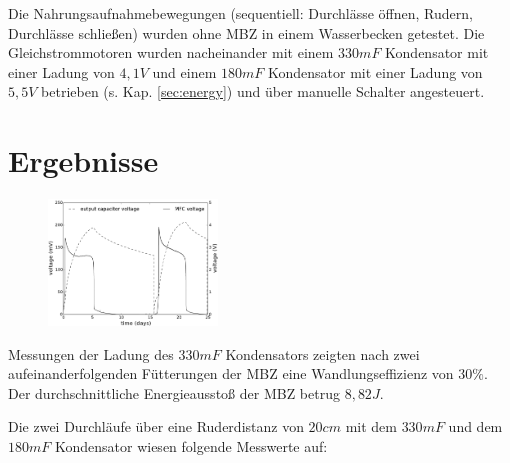 \documentclass{SeminarV2}
\begin{document}
Die Nahrungsaufnahmebewegungen (sequentiell: Durchlässe öffnen, Rudern, Durchlässe schließen) wurden ohne MBZ in einem Wasserbecken getestet. Die Gleichstrommotoren wurden nacheinander mit einem $330mF$ Kondensator mit einer Ladung von $4,1V$ und einem $180mF$ Kondensator mit einer Ladung von $5,5V$ betrieben (s. Kap. \ref{sec:energy}) und über manuelle Schalter angesteuert.\cite[S. 3891]{DBLP:conf/iros/PhilamoreRSI15}

\section{Ergebnisse}
\begin{figure}[ht]
\centering
\includegraphics[width=0.4\textwidth]{pics/charge}
\end{figure}
Messungen der Ladung des $330mF$ Kondensators zeigten nach zwei aufeinanderfolgenden Fütterungen der MBZ eine Wandlungseffizienz von $30\%$. Der durchschnittliche Energieausstoß der MBZ betrug $8,82J$.

Die zwei Durchläufe über eine Ruderdistanz von $20cm$ mit dem $330mF$ und dem $180mF$ Kondensator wiesen folgende Messwerte auf:
\end{document}
